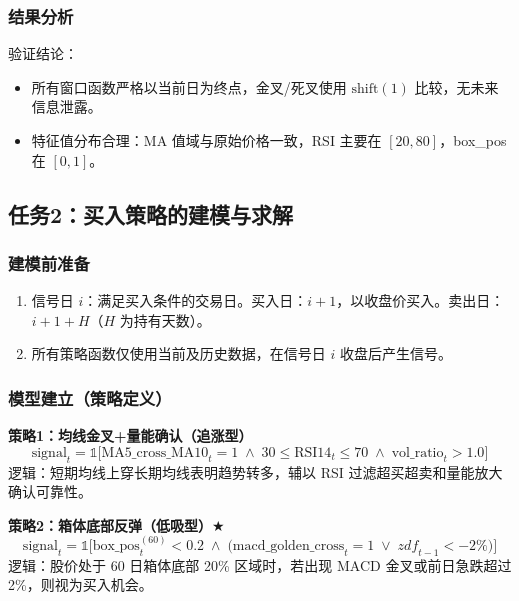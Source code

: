 \documentclass[12pt,a4paper]{ctexart}
\numberwithin{figure}{section}
\numberwithin{table}{section}
\begin{document}
\subsubsection{结果分析}
验证结论：
\begin{itemize}[leftmargin=*]
    \item 所有窗口函数严格以当前日为终点，金叉/死叉使用 $\text{shift}(1)$ 比较，无未来信息泄露。
    \item 特征值分布合理：MA 值域与原始价格一致，RSI 主要在 $[20, 80]$，box\_pos 在 $[0, 1]$。
\end{itemize}

\subsection{任务2：买入策略的建模与求解}

\subsubsection{建模前准备}
\begin{enumerate}[leftmargin=*]
    \item 信号日 $i$：满足买入条件的交易日。买入日：$i+1$，以收盘价买入。卖出日：$i+1+H$（$H$ 为持有天数）。
    \item 所有策略函数仅使用当前及历史数据，在信号日 $i$ 收盘后产生信号。
\end{enumerate}

\subsubsection{模型建立（策略定义）}

\noindent\textbf{策略1：均线金叉+量能确认（追涨型）}
\begin{equation}
    \text{signal}_t = \mathbb{1}\bigl[
        \text{MA5\_cross\_MA10}_t = 1
        \;\land\; 30 \le \text{RSI14}_t \le 70
        \;\land\; \text{vol\_ratio}_t > 1.0
    \bigr]
\end{equation}
逻辑：短期均线上穿长期均线表明趋势转多，辅以 RSI 过滤超买超卖和量能放大确认可靠性。

\noindent\textbf{策略2：箱体底部反弹（低吸型）$\bigstar$}
\begin{equation}
    \text{signal}_t = \mathbb{1}\bigl[
        \text{box\_pos}_t^{(60)} < 0.2
        \;\land\; \bigl(
            \text{macd\_golden\_cross}_t = 1
            \;\lor\; \mathit{zdf}_{t-1} < -2\%
        \bigr)
    \bigr]
\end{equation}
逻辑：股价处于 60 日箱体底部 20\% 区域时，若出现 MACD 金叉或前日急跌超过 2\%，则视为买入机会。
\end{document}
